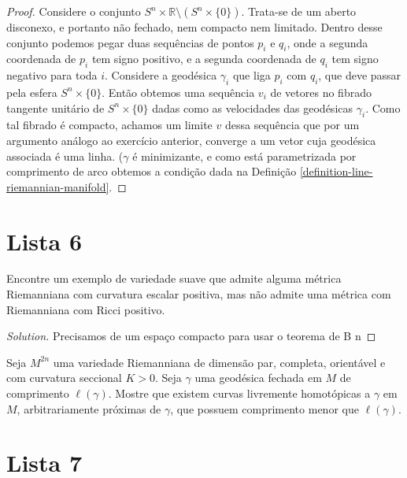 \begin{proof}
Considere o conjunto $S^n\times \mathbb{R}\setminus(S^n \times\{0\})$.
Trata-se de um aberto disconexo, e portanto não fechado, nem compacto nem
limitado.  Dentro desse conjunto podemos pegar duas sequências de pontos $p_i$ e
$q_i$, onde a segunda coordenada de $p_i$ tem signo positivo, e a segunda
coordenada de $q_i$ tem  signo negativo para toda $i$. Considere a geodésica
$\gamma_i$ que liga $p_i$ com $q_i$, que deve passar pela esfera $S^n\times
\{0\}$. Então obtemos uma sequência $v_i$ de vetores no fibrado tangente
unitário de $S^n\times\{0\}$ dadas como as velocidades das geodésicas
$\gamma_i$. Como tal fibrado é compacto, achamos um limite $v$ dessa sequência
que por um argumento análogo ao exercício anterior, converge a um vetor cuja
geodésica associada é uma linha. ($\gamma$ é minimizante, e como está
parametrizada por comprimento de arco obtemos a condição dada na Definição
\ref{definition-line-riemannian-manifold}.
\end{proof}

\section{Lista 6}
\label{section-lista-6}

\begin{exercise}
\label{exercise-l6-3}
Encontre um exemplo de variedade suave que admite alguma métrica Riemanniana com
curvatura escalar positiva, mas não admite uma métrica com Riemanniana com Ricci
positivo.
\end{exercise}

\begin{proof}[Solution]
Precisamos de um espaço compacto para usar o teorema de B n
\end{proof}

\begin{exercise}
\label{exercise-l6-6}
Seja $M^{2n}$ uma variedade Riemanniana de dimensão par, completa, orientável e
com curvatura seccional $K>0$. Seja $\gamma$ uma geodésica fechada em $M$ de
comprimento $\ell(\gamma)$. Mostre que existem curvas livremente homotópicas a
$\gamma$ em $M$, arbitrariamente próximas de $\gamma$, que possuem comprimento
menor que $\ell(\gamma)$.
\end{exercise}


\section{Lista 7}
\label{section-lista-7}

